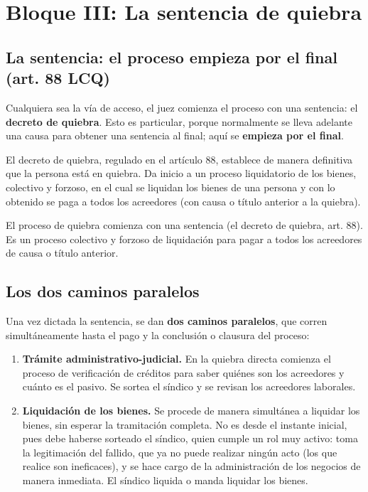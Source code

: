 \documentclass[12pt,oneside]{book}
\begin{document}
\chapter[La sentencia de quiebra]{Bloque III: La sentencia de quiebra}

\section{La sentencia: el proceso empieza por el final (art. 88 LCQ)}

Cualquiera sea la vía de acceso, el juez comienza el proceso con una sentencia: el \textbf{decreto de quiebra}. Esto es particular, porque normalmente se lleva adelante una causa para obtener una sentencia al final; aquí se \textbf{empieza por el final}.

El decreto de quiebra, regulado en el artículo 88, establece de manera definitiva que la persona está en quiebra. Da inicio a un proceso liquidatorio de los bienes, colectivo y forzoso, en el cual se liquidan los bienes de una persona y con lo obtenido se paga a todos los acreedores (con causa o título anterior a la quiebra).

\begin{important}
El proceso de quiebra comienza con una sentencia (el decreto de quiebra, art. 88). Es un proceso colectivo y forzoso de liquidación para pagar a todos los acreedores de causa o título anterior.
\end{important}

\section{Los dos caminos paralelos}

Una vez dictada la sentencia, se dan \textbf{dos caminos paralelos}, que corren simultáneamente hasta el pago y la conclusión o clausura del proceso:

\begin{enumerate}
    \item \textbf{Trámite administrativo-judicial.} En la quiebra directa comienza el proceso de verificación de créditos para saber quiénes son los acreedores y cuánto es el pasivo. Se sortea el síndico y se revisan los acreedores laborales.
    \item \textbf{Liquidación de los bienes.} Se procede de manera simultánea a liquidar los bienes, sin esperar la tramitación completa. No es desde el instante inicial, pues debe haberse sorteado el síndico, quien cumple un rol muy activo: toma la legitimación del fallido, que ya no puede realizar ningún acto (los que realice son ineficaces), y se hace cargo de la administración de los negocios de manera inmediata. El síndico liquida o manda liquidar los bienes.
\end{enumerate}
\end{document}
